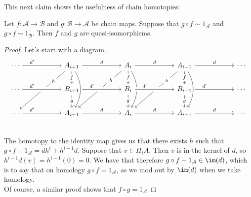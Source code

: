 This next claim shows the usefulness of chain homotopies:
\begin{lemma} Let $f:\mathcal A\to\mathcal B$ and $g:\mathcal B\to\mathcal A$ be chain maps. Suppose that $g\circ f\sim 1_{\mathcal A}$ and $g\circ f \sim 1_{\mathcal B}$. Then $f$ and $g$ are quasi-isomorphisms.
\begin{proof}
Let's start with a diagram.
$$\begin{tikzcd}[column sep=2cm]
\cdots \arrow[crossing over]{r}[near start]{d'} & A_{i+1} \arrow{r}{d}\arrow{ddl}[near start, description]{h} \arrow{d}[description]{f}\arrow[bend left]{dd}&  A_{i} \arrow{r}{d}\arrow{d}[description]{f}\arrow[bend left]{dd} \arrow{ddl}[near start, description]{h}& A_{i-1} \arrow{d}[description]{f}\arrow{r}{d}\arrow[bend left]{dd}\arrow{ddl}[near start, description]{h}& \cdots \\
\cdots \arrow[crossing over]{r}[near start]{d'} & B_{i+1} \arrow[crossing over]{r}[near start]{d'}\arrow{d}[description]{g}&  B_{i} \arrow[crossing over]{r}[near start]{d'}\arrow{d}[description]{g}& B_{i-1}\arrow{d}[description]{g}\arrow[crossing over]{r}[near start]{d'}& \cdots \\
\cdots \arrow[crossing over]{r}[near start]{d'} & A_{i+1} \arrow{r}{d}            &   A_{i} \arrow{r}{d}             & A_{i-1}\arrow{r}{d}             & \cdots \\
\end{tikzcd}$$
The homotopy to the identity map gives us that there exists $h$ such that $g\circ f- 1_{\mathcal A}=dh^{i}+h^{i-1}d$. Suppose that $v\in H_i{A}$. Then $v$ is in the kernel of $d$, so $h^{i-1}d(v)=h^{i-1}(0)=0$. We have that therefore $g\circ f - 1_{\mathcal A}\in \im(d)$, which is to say that on homology $g\circ f = 1_{\mathcal A}$, as we mod out by $\im(d)$ when we take homology.\\
Of course, a similar proof shows that $f\circ g=1_{\mathcal A}$
\end{proof}
\end{lemma}
